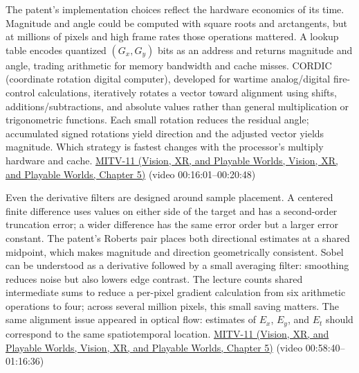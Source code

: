 The patent's implementation choices reflect the hardware economics of its time. Magnitude and angle could be computed with square roots and arctangents, but at millions of pixels and high frame rates those operations mattered. A lookup table encodes quantized \((G_x,G_y)\) bits as an address and returns magnitude and angle, trading arithmetic for memory bandwidth and cache misses. CORDIC (coordinate rotation digital computer), developed for wartime analog/digital fire-control calculations, iteratively rotates a vector toward alignment using shifts, additions/subtractions, and absolute values rather than general multiplication or trigonometric functions. Each small rotation reduces the residual angle; accumulated signed rotations yield direction and the adjusted vector yields magnitude. Which strategy is fastest changes with the processor's multiply hardware and cache. \href{../07-Vision-XR-and-Playable-Worlds/main.pdf\#nameddest=04-visual-computing-ii-ch036-mitv-11---edge-detection-subpixel-position-cordic-line-detection-us-6408109}{MITV-11 (Vision, XR, and Playable Worlds, Vision, XR, and Playable Worlds, Chapter 5)} (video 00:16:01--00:20:48)

Even the derivative filters are designed around sample placement. A centered finite difference uses values on either side of the target and has a second-order truncation error; a wider difference has the same error order but a larger error constant. The patent's Roberts pair places both directional estimates at a shared midpoint, which makes magnitude and direction geometrically consistent. Sobel can be understood as a derivative followed by a small averaging filter: smoothing reduces noise but also lowers edge contrast. The lecture counts shared intermediate sums to reduce a per-pixel gradient calculation from six arithmetic operations to four; across several million pixels, this small saving matters. The same alignment issue appeared in optical flow: estimates of \(E_x\), \(E_y\), and \(E_t\) should correspond to the same spatiotemporal location. \href{../07-Vision-XR-and-Playable-Worlds/main.pdf\#nameddest=04-visual-computing-ii-ch036-mitv-11---edge-detection-subpixel-position-cordic-line-detection-us-6408109}{MITV-11 (Vision, XR, and Playable Worlds, Vision, XR, and Playable Worlds, Chapter 5)} (video 00:58:40--01:16:36)

